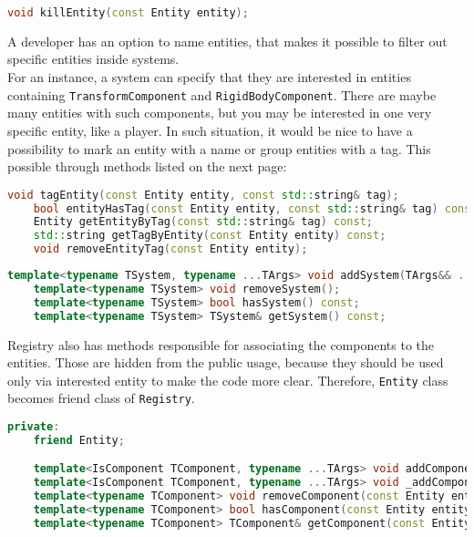 \begin{lstlisting}[language=c++, caption=Removing of an entity (./engine/include/tsengine/ecs/ecs.h)]
void killEntity(const Entity entity);
\end{lstlisting}

A developer has an option to name entities, that makes it possible to filter out specific entities inside systems.\\
For an instance, a system can specify that they are interested in entities containing \texttt{TransformComponent} and \texttt{RigidBodyComponent}. There are maybe many entities with such components, but you may be interested in one very specific entity, like a player. In such situation, it would be nice to have a possibility to mark an entity with a name or group entities with a tag. This possible through methods listed on the next page:   
\begin{lstlisting}[language=c++, caption=Registry tag and group methods (./engine/include/tsengine/ecs/ecs.h)]
    void tagEntity(const Entity entity, const std::string& tag);
    bool entityHasTag(const Entity entity, const std::string& tag) const;
    Entity getEntityByTag(const std::string& tag) const;
    std::string getTagByEntity(const Entity entity) const;
    void removeEntityTag(const Entity entity);
\end{lstlisting}

\begin{lstlisting}[language=c++, caption=Registry system methods (./engine/include/tsengine/ecs/ecs.h)]
    template<typename TSystem, typename ...TArgs> void addSystem(TArgs&& ...args);
    template<typename TSystem> void removeSystem();
    template<typename TSystem> bool hasSystem() const;
    template<typename TSystem> TSystem& getSystem() const;
\end{lstlisting}

Registry also has methods responsible for associating the components to the entities.
Those are hidden from the public usage, because they should be used only via interested entity to make the code more clear. Therefore, \texttt{Entity} class becomes friend class of \texttt{Registry}. 
\begin{lstlisting}[language=c++, caption=Registry component addition methods (./engine/include/tsengine/ecs/ecs.h)]
private:
    friend Entity;

    template<IsComponent TComponent, typename ...TArgs> void addComponent(const Entity entity, TArgs&& ...args);
    template<IsComponent TComponent, typename ...TArgs> void _addComponent(const Entity entity, TArgs&& ...args);
    template<typename TComponent> void removeComponent(const Entity entity);
    template<typename TComponent> bool hasComponent(const Entity entity) const;
    template<typename TComponent> TComponent& getComponent(const Entity entity) const;
\end{lstlisting}


